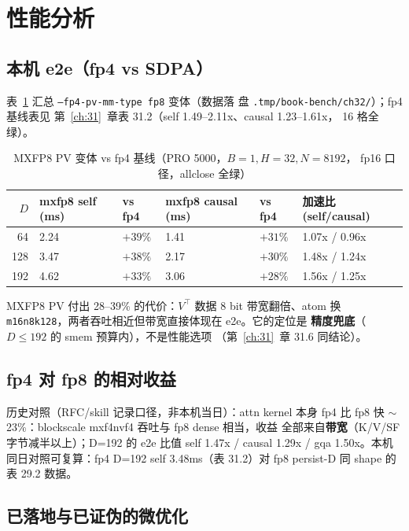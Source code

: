 \FloatBarrier

\section{性能分析}

\subsection{本机 e2e（fp4 vs SDPA）}

表~\ref{tab:32-mxfp8} 汇总 \texttt{--fp4-pv-mm-type fp8} 变体（数据落
盘 \texttt{.tmp/book-bench/ch32/}）；fp4 基线表见
第~\ref{ch:31}~章表 31.2（self 1.49--2.11x、causal 1.23--1.61x，
16 格全绿）。

\begin{table}[H]
  \centering
  \caption{MXFP8 PV 变体 vs fp4 基线（PRO 5000，$B{=}1,H{=}32,N{=}8192$，
  fp16 口径，allclose 全绿）}
  \label{tab:32-mxfp8}
  \begin{tabular}{@{}rlllll@{}}
    \toprule
    $D$ & mxfp8 self (ms) & vs fp4 & mxfp8 causal (ms) & vs fp4 & 加速比
    (self/causal) \\
    \midrule
    64  & 2.24 & $+39\%$ & 1.41 & $+31\%$ & 1.07x / 0.96x \\
    128 & 3.47 & $+38\%$ & 2.17 & $+30\%$ & 1.48x / 1.24x \\
    192 & 4.62 & $+33\%$ & 3.06 & $+28\%$ & 1.56x / 1.25x \\
    \bottomrule
  \end{tabular}
\end{table}

MXFP8 PV 付出 28--39\% 的代价：$V^\top$ 数据 8 bit 带宽翻倍、atom 换
\texttt{m16n8k128}，两者吞吐相近但带宽直接体现在 e2e。它的定位是
\textbf{精度兜底}（$D\le192$ 的 smem 预算内），不是性能选项
（第~\ref{ch:31}~章 31.6 同结论）。

\subsection{fp4 对 fp8 的相对收益}

历史对照（RFC/skill 记录口径，非本机当日）：attn kernel 本身 fp4 比
fp8 快 $\sim$23\%：blockscale mxf4nvf4 吞吐与 fp8 dense 相当，收益
全部来自\textbf{带宽}（K/V/SF 字节减半以上）；D=192 的 e2e 比值
self 1.47x / causal 1.29x / gqa 1.50x。本机同日对照可复算：fp4
D=192 self 3.48ms（表 31.2）对 fp8 persist-D 同 shape 的表 29.2 数据。

\subsection{已落地与已证伪的微优化}

